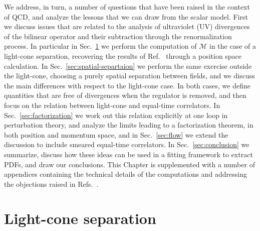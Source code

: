 We address, in turn, a number of questions that have been raised in the context of
QCD, and analyze the lessons that we can draw from the scalar model. 
First we discuss issues that are related to the analysis of ultraviolet (UV)
divergences of the bilinear operator and their subtraction through the
renormalization process. In particular in Sec.~\ref{sec:light-cone} we perform
the computation of $\mathcal{M}$ in the case of a light-cone separation,
recovering the results of Ref.~\cite{Collins:1980ui} through a position space
calculation. In Sec.~\ref{sec:spatial-separtaion} we perform the same exercise
outside the light-cone, choosing a purely spatial separation between fields, and
we discuss the main differences with respect to the light-cone case.
In both cases, we define quantities that are free of divergences when the
regulator is removed, and then focus on the relation between light-cone and
equal-time correlators. In Sec.~\ref{sec:factorization} we work out this
relation explicitly at one loop in perturbation theory, and analyze the limits
leading to a factorization theorem, in both position and momentum space, and
in Sec.~\ref{sec:flow} we extend the discussion to include smeared equal-time correlators.  
In Sec.~\ref{sec:conclusion} we summarize, discuss how these ideas can be used
in a fitting framework to extract PDFs, and draw our conclusions. This Chapter is
supplemented with a number of appendices containing the technical details of the
computations and addressing the objections raised in
Refs.~\cite{Rossi:2017muf,Rossi:2018zkn}.


\section{Light-cone separation}
\label{sec:light-cone}

